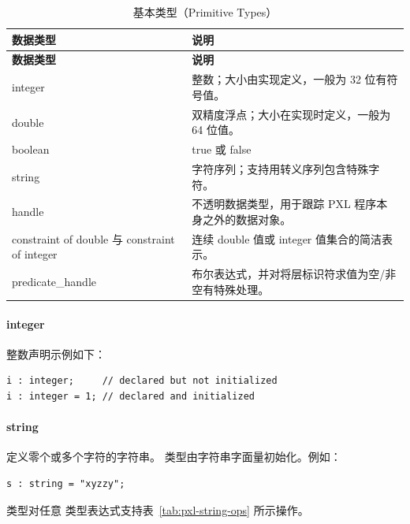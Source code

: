 \begin{longtable}{@{}>{\raggedright\arraybackslash\ttfamily}p{} p{}@{}}
\caption{基本类型（Primitive Types）}\label{tab:pxl-primitive}\\
\toprule
\textbf{\textrm{数据类型}} & \textbf{\textrm{说明}} \\
\midrule
\endfirsthead
\toprule
\textbf{\textrm{数据类型}} & \textbf{\textrm{说明}} \\
\midrule
\endhead
\bottomrule
\endfoot
integer & 整数；大小由实现定义，一般为 32 位有符号值。 \\
double & 双精度浮点；大小在实现时定义，一般为 64 位值。 \\
boolean & true 或 false \\
string & 字符序列；支持用转义序列包含特殊字符。 \\
handle & 不透明数据类型，用于跟踪 PXL 程序本身之外的数据对象。 \\
constraint of double 与 constraint of integer & 连续 double 值或 integer 值集合的简洁表示。 \\
predicate\_handle & 布尔表达式，并对将层标识符求值为空/非空有特殊处理。 \\
\end{longtable}

\paragraph{integer}

整数声明示例如下：
\begin{lstlisting}[style=pxl]
i : integer;     // declared but not initialized
i : integer = 1; // declared and initialized
\end{lstlisting}

\paragraph{string}

定义零个或多个字符的字符串。 类型由字符串字面量初始化。例如：
\begin{lstlisting}[style=pxl]
s : string = "xyzzy";
\end{lstlisting}

 类型对任意  类型表达式支持表~\ref{tab:pxl-string-ops} 所示操作。

